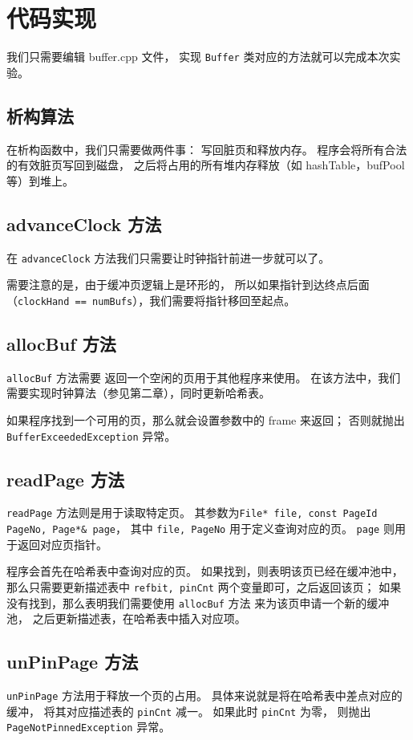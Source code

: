 \documentclass[12pt,onecolumn]{report}
\theoremstyle{plain}
\numberwithin{figure}{chapter}
\numberwithin{table}{chapter}
\numberwithin{lstlisting}{chapter}
\begin{document}
\chapter{代码实现}
我们只需要编辑 buffer.cpp 文件，
实现 \lstinline|Buffer| 类对应的方法就可以完成本次实验。

\section{析构算法}
在析构函数中，我们只需要做两件事：
写回脏页和释放内存。
程序会将所有合法的有效脏页写回到磁盘，
之后将占用的所有堆内存释放（如 hashTable，bufPool 等）到堆上。

\section{advanceClock 方法}
在 \lstinline|advanceClock| 方法我们只需要让时钟指针前进一步就可以了。

需要注意的是，由于缓冲页逻辑上是环形的，
所以如果指针到达终点后面（\lstinline|clockHand == numBufs|），我们需要将指针移回至起点。

\section{allocBuf 方法}
\lstinline|allocBuf| 方法需要
返回一个空闲的页用于其他程序来使用。
在该方法中，我们需要实现时钟算法（参见第二章），同时更新哈希表。

如果程序找到一个可用的页，那么就会设置参数中的 frame 来返回；
否则就抛出 \lstinline|BufferExceededException| 异常。

\section{readPage 方法}
\lstinline|readPage| 方法则是用于读取特定页。
其参数为\lstinline|File* file, const PageId PageNo, Page*& page|，
其中 \lstinline|file, PageNo| 用于定义查询对应的页。
\lstinline|page| 则用于返回对应页指针。

程序会首先在哈希表中查询对应的页。
如果找到，则表明该页已经在缓冲池中，
那么只需要更新描述表中 \lstinline|refbit, pinCnt|
两个变量即可，之后返回该页；
如果没有找到，那么表明我们需要使用 \lstinline|allocBuf| 方法
来为该页申请一个新的缓冲池，
之后更新描述表，在哈希表中插入对应项。

\section{unPinPage 方法}
\lstinline|unPinPage| 方法用于释放一个页的占用。
具体来说就是将在哈希表中差点对应的缓冲，
将其对应描述表的 \lstinline|pinCnt| 减一。
如果此时 \lstinline|pinCnt| 为零，
则抛出 \lstinline|PageNotPinnedException| 异常。
\end{document}
